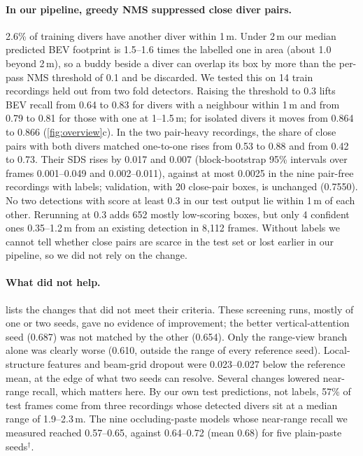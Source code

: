 \documentclass[10pt,twocolumn,letterpaper]{article}
\newcommand{\sds}{\mbox{SDS}}
\begin{document}
\paragraph{In our pipeline, greedy NMS suppressed close diver pairs.}
2.6\% of training divers have another diver within 1\,m.
Under 2\,m our median predicted BEV footprint is 1.5--1.6 times the labelled one in area (about 1.0 beyond 2\,m), so a buddy beside a diver can overlap its box by more than the per-pass NMS threshold of 0.1 and be discarded.
We tested this on 14 train recordings held out from two fold detectors.
Raising the threshold to 0.3 lifts BEV recall from 0.64 to 0.83 for divers with a neighbour within 1\,m and from 0.79 to 0.81 for those with one at 1--1.5\,m; for isolated divers it moves from 0.864 to 0.866 (\cref{fig:overview}c).
In the two pair-heavy recordings, the share of close pairs with both divers matched one-to-one rises from 0.53 to 0.88 and from 0.42 to 0.73.
Their \sds{} rises by 0.017 and 0.007 (block-bootstrap 95\% intervals over frames 0.001--0.049 and 0.002--0.011), against at most 0.0025 in the nine pair-free recordings with labels; validation, with 20 close-pair boxes, is unchanged (0.7550).
No two detections with score at least 0.3 in our test output lie within 1\,m of each other.
Rerunning at 0.3 adds 652 mostly low-scoring boxes, but only 4 confident ones 0.35--1.2\,m from an existing detection in 8{,}112 frames.
Without labels we cannot tell whether close pairs are scarce in the test set or lost earlier in our pipeline, so we did not rely on the change.

\paragraph{What did not help.}
 lists the changes that did not meet their criteria.
These screening runs, mostly of one or two seeds, gave no evidence of improvement; the better vertical-attention seed (0.687) was not matched by the other (0.654).
Only the range-view branch alone was clearly worse (0.610, outside the range of every reference seed).
Local-structure features and beam-grid dropout were 0.023--0.027 below the reference mean, at the edge of what two seeds can resolve.
Several changes lowered near-range recall, which matters here.
By our own test predictions, not labels, 57\% of test frames come from three recordings whose detected divers sit at a median range of 1.9--2.3\,m.
The nine occluding-paste models whose near-range recall we measured reached 0.57--0.65, against 0.64--0.72 (mean 0.68) for five plain-paste seeds$^\dagger$.
\end{document}

